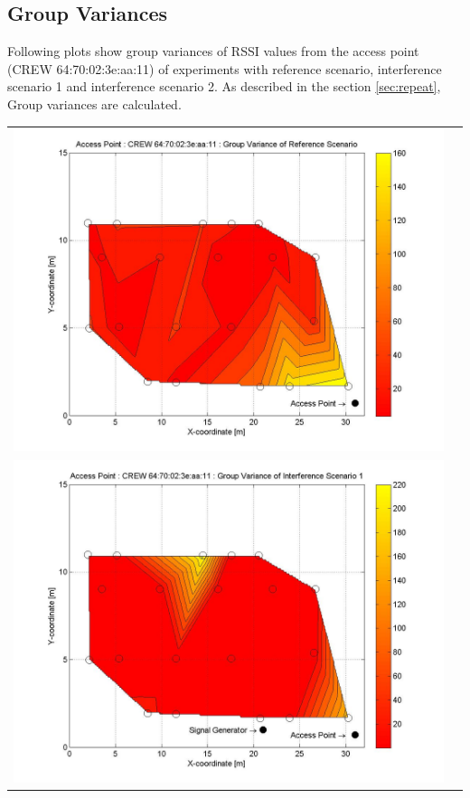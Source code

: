 \documentclass[11pt,a4paper,headinclude,footinclude,chapterprefix=on]{scrreprt}
\begin{document}
\subsection{Group Variances} 
Following plots show group variances of RSSI values from the access point (CREW 64:70:02:3e:aa:11) of experiments with reference scenario, interference scenario 1 and interference scenario 2. As described in the section \ref{sec:repeat}, Group variances are calculated.  
\begin{longtable}
	{lr} 
	\includegraphics[width=13cm]{../../Source/plot/CREW_11/11_Ref_Group_Variance.jpg} \\
	\includegraphics[width=13cm]{../../Source/plot/CREW_11/11_Sig_Group_Variance.jpg} \\

\end{longtable}
\end{document}
